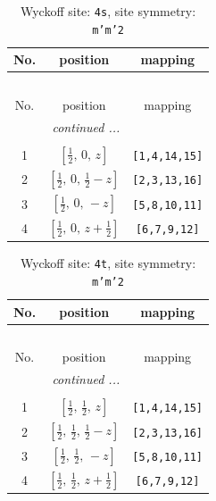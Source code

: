 \documentclass[fleqn,8pt]{jsarticle}
\begin{document}
\renewcommand{\arraystretch}{1.2}
\begin{longtable}{ccc}
\caption{Wyckoff site: {\tt 4s}, site symmetry: {\tt m'm'2}}
 \\
 \hline \hline
No. & position & mapping \\ \hline \endfirsthead

\multicolumn{2}{l}{\tablename\ \thetable{}} \\
 \hline \hline
No. & position & mapping \\ \hline \endhead

 \hline \hline
\multicolumn{2}{r}{\footnotesize\it continued ...} \\ \endfoot

 \hline \hline
\multicolumn{2}{r}{} \\ \endlastfoot

1 & $\left[ \frac{1}{2},\, 0,\, z \right]$ & {\tt [1,4,14,15]} \\ \hline
2 & $\left[ \frac{1}{2},\, 0,\, \frac{1}{2} - z \right]$ & {\tt [2,3,13,16]} \\ \hline
3 & $\left[ \frac{1}{2},\, 0,\, - z \right]$ & {\tt [5,8,10,11]} \\ \hline
4 & $\left[ \frac{1}{2},\, 0,\, z + \frac{1}{2} \right]$ & {\tt [6,7,9,12]} \\
\end{longtable}
\renewcommand{\arraystretch}{1.2}
\begin{longtable}{ccc}
\caption{Wyckoff site: {\tt 4t}, site symmetry: {\tt m'm'2}}
 \\
 \hline \hline
No. & position & mapping \\ \hline \endfirsthead

\multicolumn{2}{l}{\tablename\ \thetable{}} \\
 \hline \hline
No. & position & mapping \\ \hline \endhead

 \hline \hline
\multicolumn{2}{r}{\footnotesize\it continued ...} \\ \endfoot

 \hline \hline
\multicolumn{2}{r}{} \\ \endlastfoot

1 & $\left[ \frac{1}{2},\, \frac{1}{2},\, z \right]$ & {\tt [1,4,14,15]} \\ \hline
2 & $\left[ \frac{1}{2},\, \frac{1}{2},\, \frac{1}{2} - z \right]$ & {\tt [2,3,13,16]} \\ \hline
3 & $\left[ \frac{1}{2},\, \frac{1}{2},\, - z \right]$ & {\tt [5,8,10,11]} \\ \hline
4 & $\left[ \frac{1}{2},\, \frac{1}{2},\, z + \frac{1}{2} \right]$ & {\tt [6,7,9,12]} \\
\end{longtable}
\end{document}
